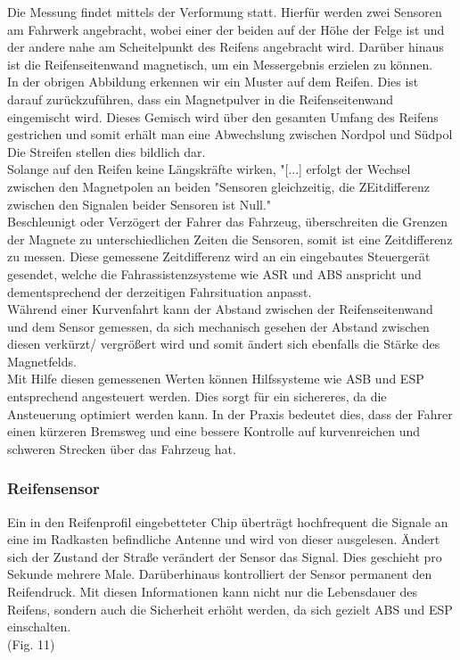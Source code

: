 				\begin{flushleft}
					
					Die Messung findet mittels der Verformung statt. Hierfür werden zwei Sensoren am Fahrwerk angebracht, wobei einer der beiden auf der Höhe der Felge ist und der andere nahe am Scheitelpunkt des Reifens angebracht wird. Darüber hinaus ist die Reifenseitenwand magnetisch, um ein Messergebnis erzielen zu können.\\
					In der obrigen Abbildung erkennen wir ein Muster auf dem Reifen. Dies ist darauf zurückzuführen, dass ein Magnetpulver in die Reifenseitenwand eingemischt wird. Dieses Gemisch wird über den gesamten Umfang des Reifens gestrichen und somit erhält man eine Abwechslung zwischen Nordpol und Südpol Die Streifen stellen dies bildlich dar.\\
					Solange auf den Reifen keine Längskräfte wirken, "[...] erfolgt der Wechsel zwischen den Magnetpolen an beiden "Sensoren gleichzeitig, die ZEitdifferenz zwischen den Signalen beider Sensoren ist Null."\cite{TS20} \\
					Beschleunigt oder Verzögert der Fahrer das Fahrzeug, überschreiten die Grenzen der Magnete zu unterschiedlichen Zeiten die Sensoren, somit ist eine Zeitdifferenz zu messen. Diese gemessene Zeitdifferenz wird an ein eingebautes Steuergerät gesendet, welche die Fahrassistenzsysteme wie ASR und ABS anspricht und dementsprechend der derzeitigen Fahrsituation anpasst.\\
					Während einer Kurvenfahrt kann der Abstand zwischen der Reifenseitenwand und dem Sensor gemessen, da sich mechanisch gesehen der Abstand zwischen diesen verkürzt/ vergrößert wird und somit ändert sich ebenfalls die Stärke des Magnetfelds.\\
					Mit Hilfe diesen gemessenen Werten können Hilfssysteme wie ASB und ESP entsprechend angesteuert werden. Dies sorgt für ein sichereres, da die Ansteuerung optimiert werden kann. In der Praxis bedeutet dies, dass der Fahrer einen kürzeren Bremsweg und eine bessere Kontrolle auf kurvenreichen und schweren Strecken über das Fahrzeug hat.
					
				\end{flushleft}
				
			\subsubsection{Reifensensor}
				Ein in den Reifenprofil eingebetteter Chip überträgt hochfrequent die Signale an eine im Radkasten befindliche Antenne und wird von dieser ausgelesen. Ändert sich der Zustand der Straße verändert der Sensor das Signal. Dies geschieht pro Sekunde mehrere Male. Darüberhinaus kontrolliert der Sensor permanent den Reifendruck. Mit diesen Informationen kann nicht nur die Lebensdauer des Reifens, sondern auch die Sicherheit erhöht werden, da sich gezielt ABS und ESP einschalten.\\(Fig. 11)
				

